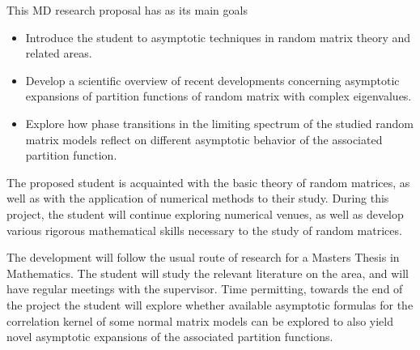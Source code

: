 This MD research proposal has as its main goals

\begin{itemize}
\item Introduce the student to asymptotic techniques in random matrix theory and related areas.
\item Develop a scientific overview of recent developments concerning asymptotic expansions of partition functions of random matrix with complex eigenvalues.
\item Explore how phase transitions in the limiting spectrum of the studied random matrix models reflect on different asymptotic behavior of the associated partition function.
\end{itemize}

The proposed student is acquainted with the basic theory of random matrices, as well as with the application of numerical methods to their study. During this project, the student will continue exploring numerical venues, as well as develop various rigorous mathematical skills necessary to the study of random matrices.

The development will follow the usual route of research for a Masters Thesis in Mathematics. The student will study the relevant literature on the area, and will have regular meetings with the supervisor. Time permitting, towards the end of the project the student will explore whether available asymptotic formulas for the correlation kernel of some normal matrix models can be explored to also yield novel asymptotic expansions of the associated partition functions.